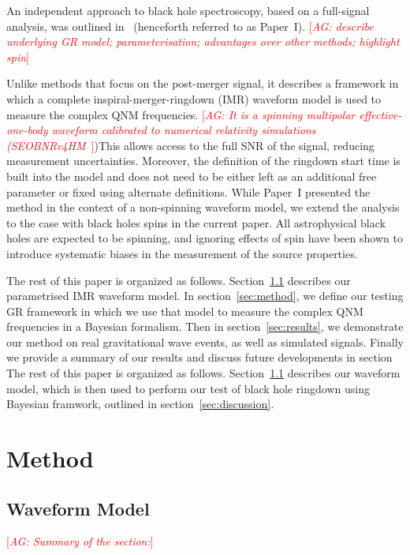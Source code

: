 \documentclass[twocolumn,prd,superscriptaddress,amsfonts,amssymb,amsmath,preprintnumbers]{revtex4-1}
\newcommand{\paperone}{Paper~I\xspace}
\newcommand{\abhi}[1]{\textcolor{red}{[\textit{AG: #1}]}}
\begin{document}
\par
An independent approach to black hole spectroscopy, based on a full-signal analysis, was outlined in~\citep{Brito:2018rfr} (henceforth referred to as \paperone). \abhi{describe underlying GR model; parameterisation; advantages over other methods; highlight spin} 



Unlike methods that focus on the post-merger signal, it describes a framework in which a complete inspiral-merger-ringdown (IMR) waveform model is used to measure the complex QNM frequencies. \abhi{It is a spinning multipolar effective-one-body waveform calibrated to numerical relativity simulations (SEOBNRv4HM~\citep{Cotesta:2018fcv}})This allows access to the full SNR of the signal, reducing measurement uncertainties. Moreover, the definition of the ringdown start time is built into the model and does not need to be either left as an additional free parameter or fixed using alternate definitions. While \paperone presented the method in the context of a non-spinning waveform model, we extend the analysis to the case with black holes spins in the current paper. All astrophysical black holes are expected to be spinning, and ignoring effects of spin have been shown to introduce systematic biases in the measurement of the source properties.
\par
The rest of this paper is organized as follows. Section~\ref{sec:model} describes our parametrised IMR waveform model. In section~\ref{sec:method}, we define our testing GR framework in which we use that model to measure the complex QNM frequencies in a Bayesian formalism. Then in section~\ref{sec:results}, we demonstrate our method on real gravitational wave events, as well as simulated signals. Finally we provide a summary of our results and discuss future developments in section  The rest of this paper is organized as follows. Section~\ref{sec:model} describes our waveform model, which is then used to perform our test of black hole ringdown using Bayesian framwork, outlined in section~\ref{sec:discussion}.

\section{Method}
\subsection{Waveform Model}\label{sec:model}

\abhi{Summary of the section:}
\end{document}
